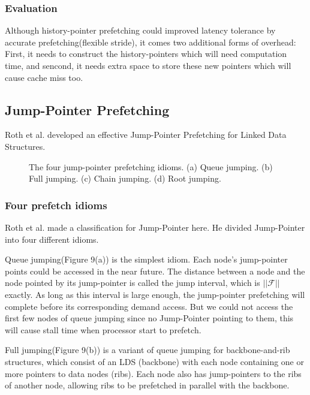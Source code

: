 \documentclass{acm_proc_article-sp}
\begin{document}
\subsubsection{Evaluation}

Although history-pointer prefetching could improved latency tolerance
by accurate prefetching(flexible stride), it comes two additional 
forms of overhead: First, it needs to construct the history-pointers
which will need computation time, and sencond, it needs extra space to
store these new pointers which will cause cache miss too.
 
\subsection{Jump-Pointer Prefetching}
Roth et al. developed an effective Jump-Pointer Prefetching for Linked
Data Structures.\cite{Roth:1999:EJP:307338.300989}

\begin{figure*}
\centering
{}
\caption{The four jump-pointer prefetching idioms. (a) Queue
  jumping. (b) Full jumping. (c) Chain jumping. (d) Root jumping.}
\end{figure*}

\subsubsection{Four prefetch idioms}
Roth et al. made a classification for Jump-Pointer here.
He divided Jump-Pointer into four different
idioms.\cite{Roth:1999:EJP:307338.300989} 

Queue jumping(Figure 9(a)) is the simplest idiom. Each node’s
jump-pointer points could  be accessed in the near future. The
distance between a node and the node pointed by its jump-pointer is 
called the jump interval, which is $||\mathcal{F}||$ exactly. As long
as this interval is large enough, 
the jump-pointer prefetching will 
complete before its corresponding demand access. 
But we could not access the first few nodes of queue jumping since no
Jump-Pointer pointing to them, this will cause stall time when
processor start to prefetch.

Full jumping(Figure 9(b)) is a variant of queue jumping for backbone-and-rib
structures, which consist of an LDS (backbone) with each node
containing one or more pointers to data 
nodes (ribs). Each node also has jump-pointers to the ribs of another
node, allowing ribs to be prefetched in parallel with the backbone. 
\end{document}

